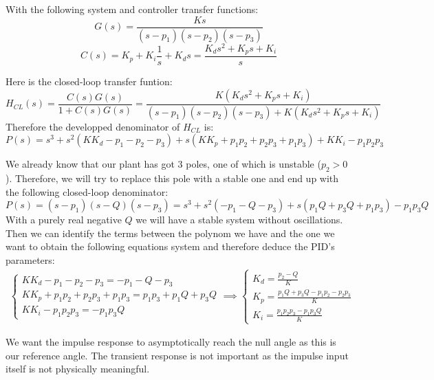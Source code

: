 \documentclass[11pt]{article}
\begin{document}
With the following system and controller transfer functions:
\begin{equation*}
G(s)=\frac{Ks}{(s-p_1)(s-p_2)(s-p_3)}
\end{equation*}
\begin{equation*}
C(s)=K_p+K_i\frac{1}{s}+K_ds=\frac{K_ds^2+K_ps+K_i}{s}
\end{equation*}

Here is the closed-loop transfer funtion:
\begin{equation*}
H_{CL}(s)=\frac{C(s)G(s)}{1+C(s)G(s)}=\frac{K(K_ds^2+K_ps+K_i)}{(s-p_1)(s-p_2)(s-p_3)+K(K_ds^2+K_ps+K_i)}
\end{equation*}
Therefore the developped denominator of $H_{CL}$ is:
\begin{equation*}
P(s)=s^3+s^2(KK_d-p_1-p_2-p_3)+s(KK_p+p_1p_2+p_2p_3+p_1p_3)+KK_i-p_1p_2p_3
\end{equation*}

We already know that our plant has got 3 poles, one of which is unstable ($p_2>0$). Therefore, we will try to replace this pole with a stable one and end up with the following closed-loop denominator:
\begin{equation*}
P(s)=(s-p_1)(s-Q)(s-p_3)=s^3+s^2(-p_1-Q-p_3)+s(p_1Q+p_3Q+p_1p_3)-p_1p_3Q
\end{equation*}
With a purely real negative $Q$ we will have a stable system without oscillations. Then we can identify the terms between the polynom we have and the one we want to obtain the following equations system and therefore deduce the PID's parameters:
\begin{align*}
\begin{cases}
KK_d-p_1-p_2-p_3=-p_1-Q-p_3 \\
KK_p+p_1p_2+p_2p_3+p_1p_3=p_1p_3+p_1Q+p_3Q \\
KK_i-p_1p_2p_3=-p_1p_3Q
\end{cases}
\implies
\begin{cases}
K_d=\frac{p_2-Q}{K} \\
K_p=\frac{p_1Q+p_3Q-p_1p_2-p_2p_3}{K} \\
K_i=\frac{p_1p_2p_3-p_1p_3Q}{K}
\end{cases}
\end{align*}

We want the impulse response to asymptotically reach the null angle as this is our reference angle. The transient response is not important as the impulse input itself is not physically meaningful.\\
\end{document}
